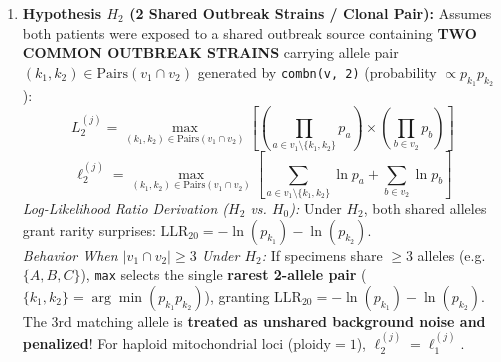 \documentclass[11pt,a4paper]{article}
\begin{document}
\begin{enumerate}[leftmargin=*]
\begin{equation}
    \text{LLR}_{10} = \ln \left( \frac{L_1^{(j)}}{L_0^{(j)}} \right) = \ln \left( \frac{p_k \cdot \prod_{a \neq k} p_a \cdot \prod_{b \neq k} p_b}{p_k^2 \cdot \prod_{a \neq k} p_a \cdot \prod_{b \neq k} p_b} \right) = \ln \left( \frac{1}{p_k} \right) = -\ln(p_k)
    \end{equation}
    \textit{Behavior When $|v_1 \cap v_2| \ge 2$ Under $H_1$:} If specimens share multiple alleles (e.g. $v_1 \cap v_2 = \{A, B\}$), \texttt{max} selects the single \textbf{rarest matching allele} ($k = \arg\min(p_A, p_B)$), yielding $\text{LLR}_{10} = -\ln(\min(p_A, p_B))$. The secondary matching allele is treated as an unshared background strain, granting zero additional similarity credit under $H_1$! \\
    If $v_1 \cap v_2 = \emptyset$, $\ell_1^{(j)} = \ln \left( \epsilon \cdot \min(p_1 \cup p_2) \right)$ where $\epsilon = 0.3072$ is the missing allele penalty.
    \item \textbf{Hypothesis $H_2$ (2 Shared Outbreak Strains / Clonal Pair):} Assumes both patients were exposed to a shared outbreak source containing \textbf{TWO COMMON OUTBREAK STRAINS} carrying allele pair $(k_1, k_2) \in \text{Pairs}(v_1 \cap v_2)$ generated by \texttt{combn(v, 2)} (probability $\propto p_{k_1} p_{k_2}$):
    \begin{equation}
    L_2^{(j)} = \max_{(k_1, k_2) \in \text{Pairs}(v_1 \cap v_2)} \left[ \left(\prod_{a \in v_1 \setminus \{k_1, k_2\}} p_a\right) \times \left(\prod_{b \in v_2} p_b\right) \right]
    \end{equation}
    \begin{equation}
    \ell_2^{(j)} = \max_{(k_1, k_2) \in \text{Pairs}(v_1 \cap v_2)} \left[ \sum_{a \in v_1 \setminus \{k_1, k_2\}} \ln p_a + \sum_{b \in v_2} \ln p_b \right]
    \end{equation}
    \textit{Log-Likelihood Ratio Derivation ($H_2$ vs. $H_0$):} Under $H_2$, both shared alleles grant rarity surprises: $\text{LLR}_{20} = -\ln(p_{k_1}) - \ln(p_{k_2})$. \\
    \textit{Behavior When $|v_1 \cap v_2| \ge 3$ Under $H_2$:} If specimens share $\ge 3$ alleles (e.g. $\{A, B, C\}$), \texttt{max} selects the single \textbf{rarest 2-allele pair} ($\{k_1, k_2\} = \arg\min (p_{k_1} p_{k_2})$), granting $\text{LLR}_{20} = -\ln(p_{k_1}) - \ln(p_{k_2})$. The 3rd matching allele is \textbf{treated as unshared background noise and penalized}! For haploid mitochondrial loci ($\text{ploidy}=1$), $\ell_2^{(j)} = \ell_1^{(j)}$.
\end{enumerate}
\end{document}
